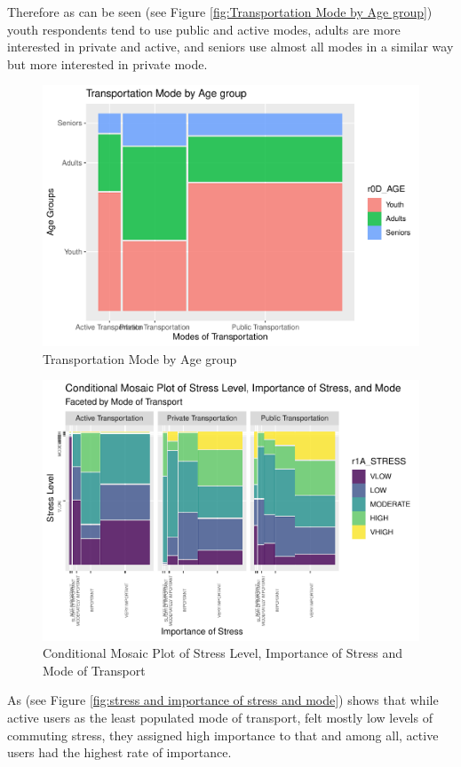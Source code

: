 \documentclass[
11pt, %
oneside, %
english, %
singlespacing, %
]{macthesis} %
\begin{document}
Therefore as can be seen (see Figure \ref{fig:Transportation Mode by Age group}) youth respondents tend to use public and active modes, adults are more interested in private and active, and seniors use almost all modes in a similar way but more interested in private mode.
\begin{figure}
\includegraphics[width=0.85\linewidth]{thesis_files/figure-latex/unnamed-chunk-24-1} \caption{\label{fig:Transportation Mode by Age group}Transportation Mode by Age group}\label{fig:unnamed-chunk-24}
\end{figure}
\begin{figure}
\includegraphics[width=0.85\linewidth]{thesis_files/figure-latex/unnamed-chunk-25-1} \caption{\label{fig:stress and importance of stress and mode}Conditional Mosaic Plot of Stress Level, Importance of Stress and Mode of Transport}\label{fig:unnamed-chunk-25}
\end{figure}
As (see Figure \ref{fig:stress and importance of stress and mode}) shows that while active users as the least populated mode of transport, felt mostly low levels of commuting stress, they assigned high importance to that and among all, active users had the highest rate of importance.
\end{document}
